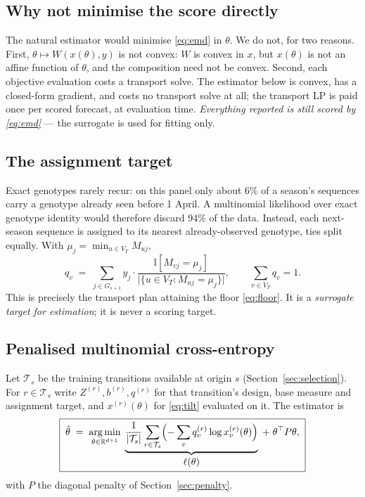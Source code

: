 \documentclass[11pt]{article}
\theoremstyle{remark}
\DeclareMathOperator*{\argmin}{arg\,min}
\newcommand{\R}{\mathbb{R}}
\newcommand{\1}{\mathbf{1}}
\newcommand{\Ind}[1]{\mathbb{I}\!\left[#1\right]}
\newcommand{\VT}{V_T}
\begin{document}
\subsection{Why not minimise the score directly}

The natural estimator would minimise \eqref{eq:emd} in $\theta$. We do not, for two
reasons. First, $\theta \mapsto W(x(\theta), y)$ is not convex: $W$ is convex in $x$, but
$x(\theta)$ is not an affine function of $\theta$, and the composition need not be convex.
Second, each objective evaluation costs a transport solve. The estimator below is convex,
has a closed-form gradient, and costs no transport solve at all; the transport LP is paid
once per scored forecast, at evaluation time. \emph{Everything reported is still scored by
\eqref{eq:emd}} --- the surrogate is used for fitting only.

\subsection{The assignment target}

Exact genotypes rarely recur: on this panel only about $6\%$ of a season's sequences carry
a genotype already seen before 1 April. A multinomial likelihood over exact genotype
identity would therefore discard $94\%$ of the data. Instead, each next-season sequence is
assigned to its nearest already-observed genotype, ties split equally. With
$\mu_j = \min_{u \in \VT} M_{uj}$,
\begin{equation}
  q_v \;=\; \sum_{j \in G_{s+1}} y_j \cdot
  \frac{\Ind{M_{vj} = \mu_j}}{\bigl|\{u \in \VT : M_{uj} = \mu_j\}\bigr|},
  \qquad \sum_{v \in \VT} q_v = 1 .
  \label{eq:assign}
\end{equation}
This is precisely the transport plan attaining the floor \eqref{eq:floor}. It is a
\emph{surrogate target for estimation}; it is never a scoring target.

\subsection{Penalised multinomial cross-entropy}

Let $\mathcal{T}_s$ be the training transitions available at origin $s$
(Section~\ref{sec:selection}). For $r \in \mathcal{T}_s$ write $Z^{(r)}, b^{(r)},
q^{(r)}$ for that transition's design, base measure and assignment target, and
$x^{(r)}(\theta)$ for \eqref{eq:tilt} evaluated on it. The estimator is
\begin{equation}
  \boxed{\;
  \hat\theta \;=\; \argmin_{\theta \in \R^{d+1}}\;
  \underbrace{\frac{1}{|\mathcal{T}_s|}\sum_{r \in \mathcal{T}_s}
  \Bigl(-\sum_{v} q^{(r)}_v \log x^{(r)}_v(\theta)\Bigr)}_{\textstyle \ell(\theta)}
  \;+\; \theta^\top P \theta ,
  \;}
  \label{eq:est}
\end{equation}
with $P$ the diagonal penalty of Section~\ref{sec:penalty}.
\end{document}
